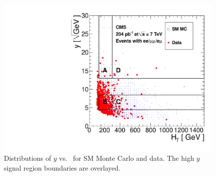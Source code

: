 \begin{figure}[tbh]
\begin{center}
\includegraphics[width=0.6\linewidth]{plots/abcd_204pb_highy.pdf}
\caption{\label{fig:abcdData2}\protect Distributions of $y$ 
vs. \Ht\ for SM Monte Carlo and data. The high $y$ signal region boundaries are overlayed.}
\end{center}
\end{figure}


